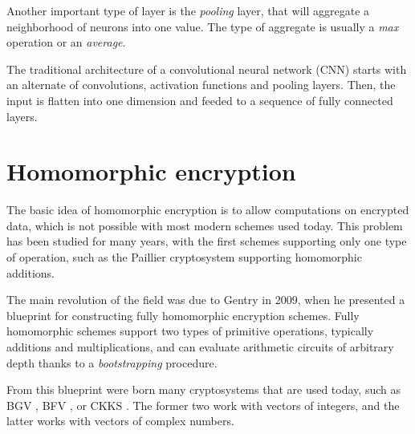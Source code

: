 \documentclass[a4paper,11pt,oneside]{report}
\begin{document}
Another important type of layer is the \emph{pooling} layer, that will aggregate a neighborhood of neurons into one value. 
The type of aggregate is usually a \emph{max} operation or an \emph{average}.

The traditional architecture of a convolutional neural network (CNN) starts with an alternate of convolutions, activation functions and pooling layers. 
Then, the input is flatten into one dimension and feeded to a sequence of fully connected layers.


\section{Homomorphic encryption}

The basic idea of homomorphic encryption is to allow computations on encrypted data, which is not possible with most modern schemes used today. 
This problem has been studied for many years, with the first schemes supporting only one type of operation, such as the Paillier \cite{paillier_public-key_1999} cryptosystem supporting homomorphic additions. 

The main revolution of the field was due to Gentry \cite{gentry_fully_2009} in 2009, when he presented a blueprint for constructing fully homomorphic encryption schemes. 
Fully homomorphic schemes support two types of primitive operations, typically additions and multiplications, and can evaluate arithmetic circuits of arbitrary depth thanks to a \emph{bootstrapping} procedure.

From this blueprint were born many cryptosystems that are used today, such as BGV \cite{brakerski_leveled_2012}, BFV \cite{fan_somewhat_2012}, or CKKS \cite{cheon_homomorphic_2016, cheon_full_2018}. 
The former two work with vectors of integers, and the latter works with vectors of complex numbers.
\end{document}
